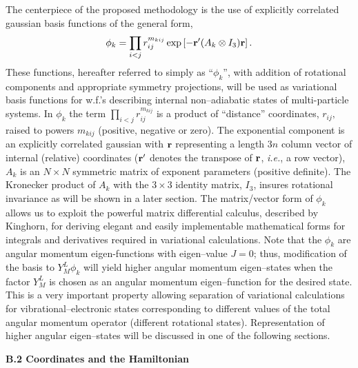 The centerpiece of the 
proposed methodology is the use of explicitly 
correlated gaussian basis functions of the
general form, 
\begin{equation}
\phi _k=\prod_{i<j}r_{ij}^{m_{kij}}\exp \left[ -{\bf r}^{\prime
}(A_k\otimes I_3){\bf r}\right] .  
\label{basisfcn}
\end{equation}
These functions, hereafter referred to simply as ``$\phi_k$'', 
with addition of rotational components
and appropriate symmetry projections, will be used as variational basis
functions for w.f.'s describing internal non--adiabatic
states of multi-particle systems. In $\phi_k$ 
the term $\prod_{i<j}r_{ij}^{m_{kij}}$ is a product of ``distance''
coordinates, $r_{ij},$ raised to powers $m_{kij}$ (positive, negative
\cite{kpc}
or zero).
The exponential component is an explicitly correlated gaussian with 
${\bf r}$ representing a length $3n$ column vector of internal (relative)
coordinates (${\bf r}^{\prime }$ denotes the transpose of ${\bf r}$,
{\it i.e.}, a row vector), $A_k$ is an 
$N\times N$ symmetric matrix of exponent
parameters (positive definite). The Kronecker product of
$A_k$
with the $3\times 3$ identity matrix, $I_3$, insures rotational invariance
as will be shown in a later section. The matrix/vector form of $\phi _k$
allows us to exploit the powerful 
matrix differential calculus, described by
Kinghorn\cite{Kinghorn95a}, for deriving 
elegant and easily implementable
mathematical forms for integrals and 
derivatives required in variational
calculations.
Note that 
the $\phi _k$ are angular momentum eigen-functions
with eigen--value $J=0$; thus, 
modification of the basis to $Y_M^L\phi _k$
will yield higher angular momentum 
eigen--states when the factor $Y_M^L$ is
chosen as an angular momentum 
eigen--function for the desired state.
This is a very important property 
allowing separation of variational calculations 
for vibrational--electronic states 
corresponding to different
values of the total angular 
momentum operator (different rotational states).
Representation of higher angular 
eigen--states will be discussed in 
one of the following sections.



\vspace{2mm}
\noindent
{\bf B.2 Coordinates and the Hamiltonian}

